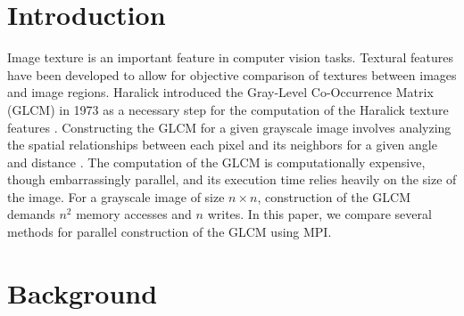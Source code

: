 \documentclass{article}
\begin{document}


\begin{abstract}

\end{abstract}

\section{Introduction}
    Image texture is an important feature in computer vision tasks. Textural features have been developed to allow for objective comparison of textures between images and image regions. Haralick introduced the Gray-Level Co-Occurrence Matrix (GLCM) in 1973 as a necessary step for the computation of the Haralick texture features \cite{haralick}. Constructing the GLCM for a given grayscale image involves analyzing the spatial relationships between each pixel and its neighbors for a given angle and distance \cite{haralick}. The computation of the GLCM is computationally expensive, though embarrassingly parallel, and its execution time relies heavily on the size of the image. For a grayscale image of size $n \times n$, construction of the GLCM demands $n^2$ memory accesses and $n$ writes. In this paper, we compare several methods for parallel construction of the GLCM using MPI.
\section{Background}
\end{document}
